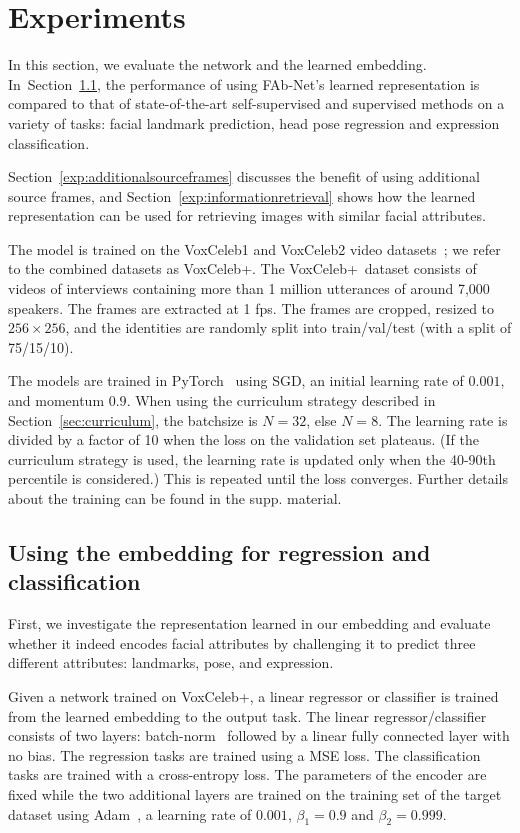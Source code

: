 \documentclass{bmvc2k}
\newcommand{\secref}[1]{Section~\ref{#1}}
\def\networkname{FAb-Net}
\def\voxcombiname{VoxCeleb+}
\begin{document}
\section{Experiments}\label{sec:experiments}

In this section, we evaluate the network and the learned embedding. In~\secref{exp:embeddingclassifier}, the performance of using \networkname's learned representation is compared to that of state-of-the-art self-supervised and supervised methods on a variety of tasks: facial landmark prediction, head pose regression and expression classification.

\secref{exp:additionalsourceframes} discusses the benefit  of using additional source frames,  and \secref{exp:informationretrieval} shows how the learned representation can be used for
retrieving images with similar facial attributes.

 The model is trained on the VoxCeleb1 and VoxCeleb2 video datasets~\cite{Nagrani17,Chung18a}; we refer to the combined datasets as \voxcombiname. The \voxcombiname~dataset consists of videos of interviews containing more than 1 million utterances of around 7,000 speakers. The frames are extracted at 1 fps.
The frames are cropped, resized to $256\times256$, and the identities are randomly split into train/val/test (with a split of 75/15/10).

The models are trained in PyTorch~\cite{Pytorch} using SGD, an initial learning rate of $0.001$, and momentum $0.9$. 
When using the curriculum strategy described in \secref{sec:curriculum}, the batchsize is $N=32$, else $N=8$. 
The learning rate is divided by a factor of 10 when the loss on the validation set plateaus.
(If the curriculum strategy is used, the learning rate is updated only when the 40-90th percentile is considered.)
This is repeated until the loss converges. Further details about the training can be found in the supp. material.




\subsection{Using the embedding for regression and classification}
\label{exp:embeddingclassifier}
First, we investigate the representation learned in our embedding and evaluate whether it indeed encodes facial attributes by challenging it to predict three different attributes: landmarks, pose, and expression.

Given a network trained on \voxcombiname, a linear regressor or classifier is trained from the learned embedding to the output task.
The linear regressor/classifier consists of two layers: batch-norm~\cite{ioffe2015batch} followed by a linear fully connected layer with no bias.
The regression tasks are trained using a MSE loss.
The classification tasks are trained with a cross-entropy loss.
The parameters of the encoder are fixed while the two additional layers are trained on the training set of the target dataset using Adam~\cite{Kingma15}, a learning rate of $0.001$, $\beta_1=0.9$ and $\beta_2=0.999$.
\end{document}
